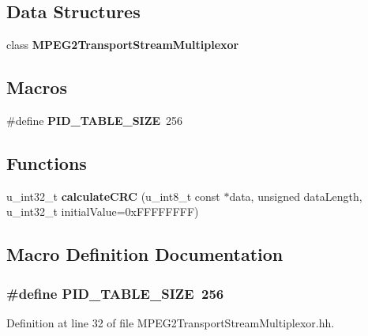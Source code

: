 \subsection*{Data Structures}
\begin{DoxyCompactItemize}
\item 
class {\bf M\+P\+E\+G2\+Transport\+Stream\+Multiplexor}
\end{DoxyCompactItemize}
\subsection*{Macros}
\begin{DoxyCompactItemize}
\item 
\#define {\bf P\+I\+D\+\_\+\+T\+A\+B\+L\+E\+\_\+\+S\+I\+Z\+E}~256
\end{DoxyCompactItemize}
\subsection*{Functions}
\begin{DoxyCompactItemize}
\item 
u\+\_\+int32\+\_\+t {\bf calculate\+C\+R\+C} (u\+\_\+int8\+\_\+t const $\ast$data, unsigned data\+Length, u\+\_\+int32\+\_\+t initial\+Value=0x\+F\+F\+F\+F\+F\+F\+F\+F)
\end{DoxyCompactItemize}


\subsection{Macro Definition Documentation}
\subsubsection[{P\+I\+D\+\_\+\+T\+A\+B\+L\+E\+\_\+\+S\+I\+Z\+E}]{\setlength{\rightskip}{0pt plus 5cm}\#define P\+I\+D\+\_\+\+T\+A\+B\+L\+E\+\_\+\+S\+I\+Z\+E~256}\label{MPEG2TransportStreamMultiplexor_8hh_a37e0919135fd99e71e7c1d4999c3b9d0}


Definition at line 32 of file M\+P\+E\+G2\+Transport\+Stream\+Multiplexor.\+hh.



